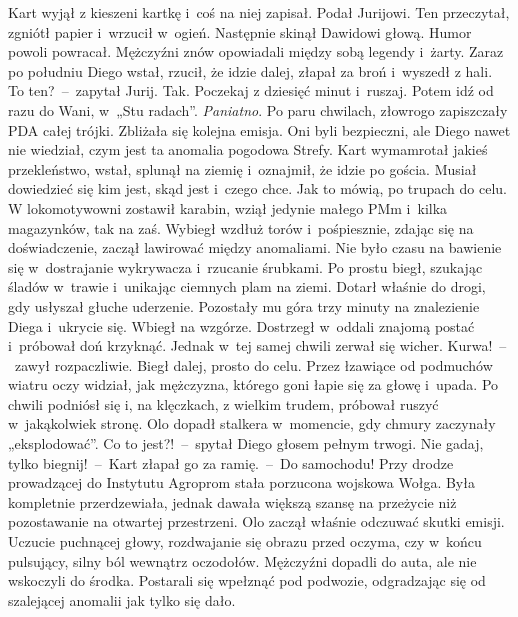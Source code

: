 \documentclass[../MAIN.tex]{subfiles}
\begin{document}
\hspace{8.6em}Kart wyjął z kieszeni kartkę i~coś na niej zapisał. Podał Jurijowi. Ten przeczytał, zgniótł papier i~wrzucił w~ogień. Następnie skinął Dawidowi głową.
\pp
Humor powoli powracał. Mężczyźni znów opowiadali między sobą legendy i~żarty. Zaraz po południu Diego wstał, rzucił, że idzie dalej, złapał za broń i~wyszedł z hali.
\sx To ten?~--~zapytał Jurij.
\xx Tak. Poczekaj z dziesięć minut i~ruszaj. Potem idź od razu do Wani, w~„Stu radach”.
\xx \textit{Paniatno}.
\qd
\hspace{6em}Po paru chwilach, złowrogo zapiszczały PDA całej trójki. Zbliżała się kolejna emisja. Oni byli bezpieczni, ale Diego nawet nie wiedział, czym jest ta anomalia pogodowa Strefy. Kart wymamrotał jakieś przekleństwo, wstał, splunął na ziemię i~oznajmił, że idzie po gościa. Musiał dowiedzieć się kim jest, skąd jest i~czego chce. Jak to mówią, po trupach do celu.
\pp
W lokomotywowni zostawił karabin, wziął jedynie małego PMm i~kilka magazynków, tak na zaś. Wybiegł wzdłuż torów i~pośpiesznie, zdając się na doświadczenie, zaczął lawirować między anomaliami. Nie było czasu na bawienie się w~dostrajanie wykrywacza i~rzucanie śrubkami. Po prostu biegł, szukając śladów w~trawie i~unikając ciemnych plam na ziemi.
\pp
Dotarł właśnie do drogi, gdy usłyszał głuche uderzenie. Pozostały mu góra trzy minuty na znalezienie Diega i~ukrycie się. Wbiegł na wzgórze. Dostrzegł w~oddali znajomą postać i~próbował doń krzyknąć. Jednak w~tej samej chwili zerwał się wicher.
\sx Kurwa!~--~zawył rozpaczliwie.
\qd
\hspace{14.4em}Biegł dalej, prosto do celu. Przez łzawiące od podmuchów wiatru oczy widział, jak mężczyzna, którego goni łapie się za głowę i~upada. Po chwili podniósł się i, na klęczkach, z wielkim trudem, próbował ruszyć w~jakąkolwiek stronę. Olo dopadł stalkera w~momencie, gdy chmury zaczynały „eksplodować”.
\sx Co to jest?!~--~spytał Diego głosem pełnym trwogi.
\xx Nie gadaj, tylko biegnij!~--~Kart złapał go za ramię.~--~Do samochodu!
\qd
\hspace{31.68em}Przy drodze prowadzącej do Instytutu Agroprom stała porzucona wojskowa Wołga. Była kompletnie przerdzewiała, jednak dawała większą szansę na przeżycie niż pozostawanie na otwartej przestrzeni. Olo zaczął właśnie odczuwać skutki emisji. Uczucie puchnącej głowy, rozdwajanie się obrazu przed oczyma, czy w~końcu pulsujący, silny ból wewnątrz oczodołów. Mężczyźni dopadli do auta, ale nie wskoczyli do środka. Postarali się wpełznąć pod podwozie, odgradzając się od szalejącej anomalii jak tylko się dało.
\end{document}
